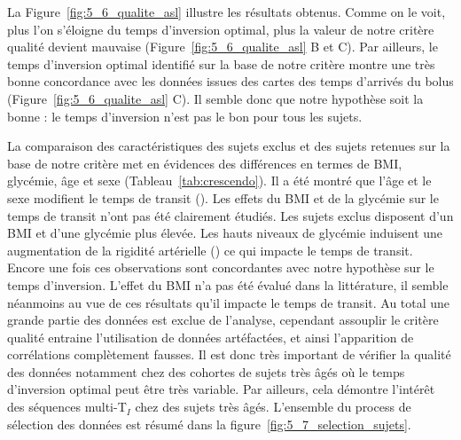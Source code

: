La Figure~\ref{fig:5_6_qualite_asl} illustre les résultats obtenus. Comme on le voit, plus l’on s’éloigne du temps
d’inversion optimal, plus la valeur de notre critère qualité devient mauvaise (Figure~\ref{fig:5_6_qualite_asl} B et C). Par
ailleurs, le temps d’inversion optimal identifié sur la base de notre critère montre une très bonne
concordance avec les données issues des cartes des temps d’arrivés du bolus (Figure~\ref{fig:5_6_qualite_asl} C). Il semble
donc que notre hypothèse soit la bonne : le temps d’inversion n’est pas le bon pour tous les sujets.

La comparaison des caractéristiques des sujets exclus et des sujets retenues sur la base de notre
critère met en évidences des différences en termes de BMI, glycémie, âge et sexe (Tableau~\ref{tab:crescendo}). Il a été
montré que l’âge et le sexe modifient le temps de transit (\cite{Liu2012}). Les effets du BMI et de la glycémie sur
le temps de transit n’ont pas été clairement étudiés. Les sujets exclus disposent d’un BMI et d’une
glycémie plus élevée. Les hauts niveaux de glycémie induisent une augmentation de la rigidité
artérielle (\cite{Rubin2012}) ce qui impacte le temps de transit. Encore une fois ces observations sont concordantes
avec notre hypothèse sur le temps d’inversion. L’effet du BMI n’a pas été évalué dans la littérature, il
semble néanmoins au vue de ces résultats qu’il impacte le temps de transit. Au total une grande partie
des données est exclue de l’analyse, cependant assouplir le critère qualité entraine l’utilisation de
données artéfactées, et ainsi l’apparition de corrélations complètement fausses. Il est donc très
important de vérifier la qualité des données notamment chez des cohortes de sujets très âgés où le
temps d’inversion optimal peut être très variable. Par ailleurs, cela démontre l’intérêt des séquences
multi-T$_I$ chez des sujets très âgés. L'ensemble du process de sélection des données est résumé dans la figure~\ref{fig:5_7_selection_sujets}.

